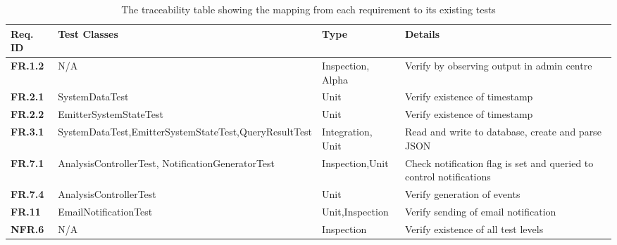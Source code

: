 \documentclass[10pt,a4paper]{article}
\newcommand{\fr}[1]{\textcolor{reqColor}{\textbf{FR.#1}}}
\newcommand{\nfr}[1]{\textcolor{reqColor}{\textbf{NFR.#1}}}
\begin{document}
\begin{table}[H]
\centering
\begin{tabular}{| p{1.5cm} | p{5cm}| p{1.8cm}| p{4.8cm}|}
  \hline\rowcolor{titleColor} \textbf{Req. ID} & \textbf{Test Classes} & \textbf{Type} & \textbf{Details}\\
  \hline \fr{1.2}   & N/A & Inspection, Alpha & Verify by observing output in admin centre\\
  \hline \fr{2.1}   & SystemDataTest & Unit & Verify existence of timestamp\\
  \hline \fr{2.2}   & EmitterSystemStateTest & Unit & Verify existence of timestamp\\
  \hline \fr{3.1}   & SystemDataTest,\newline EmitterSystemStateTest,\newline QueryResultTest & Integration, Unit & Read and write to database, create and parse JSON\\
  \hline \fr{7.1}   & AnalysisControllerTest, \newline NotificationGeneratorTest & Inspection,\newline Unit & Check notification flag is set and queried to control notifications\\
  \hline \fr{7.4}   & AnalysisControllerTest & Unit & Verify generation of events \\
  \hline \fr{11}    & EmailNotificationTest  & Unit,\newline Inspection & Verify sending of email notification \\
  \hline \nfr{6}    & N/A  & Inspection & Verify existence of all test levels \\
  \hline
  \end{tabular}
  \caption{The traceability table showing the mapping from each requirement to its existing tests}
  \label{tab:traceability}
\end{table}







\vfill


\end{document}
